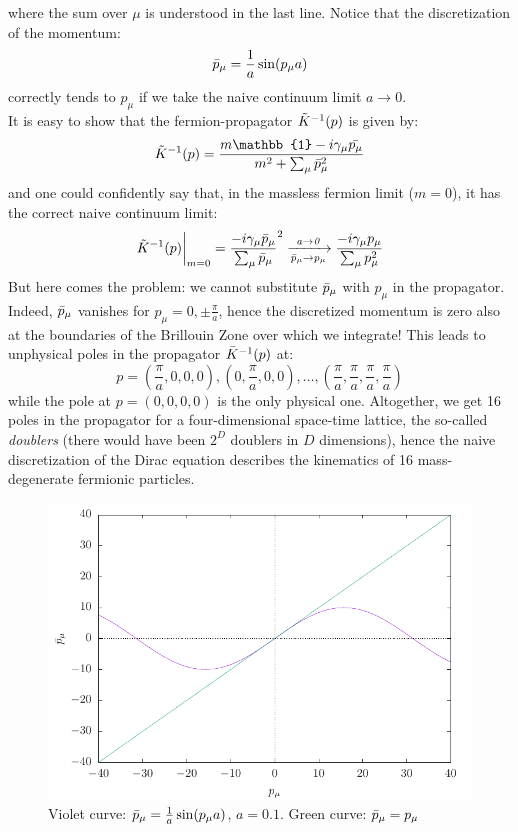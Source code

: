 where the sum over $\mu$ is understood in the last line. Notice that the discretization of the momentum:
\begin{equation}
    \Bar{p}_\mu = \frac{1}{a} \sin(p_\mu a)
\end{equation}
correctly tends to $p_\mu$ if we take the naive continuum limit $a \to 0$. 
\\ It is easy to show that the fermion-propagator $\Tilde{K}^{-1}(p)$ is given by:
\begin{equation}
    \Tilde{K}^{-1}(p) = \frac{m\mathbb{1} - i \gamma_\mu \Bar{p_\mu}}{m^2 + \sum_\mu \Bar{p}_\mu^2}
\end{equation}
and one could confidently say that, in the massless fermion limit ($m = 0$), it has the correct naive continuum limit:
\begin{equation}
    \Tilde{K}^{-1}(p) \bigg\rvert_{m = 0} = \frac{-i \gamma_\mu \Bar{p}_\mu}{\sum_\mu \Bar{p}_\mu}^2 \xrightarrow[\Bar{p}_\mu \to p_\mu]{\mathit{a \to 0}} \frac{-i \gamma_\mu p_\mu}{\sum_\mu p_\mu^2}
\end{equation}
But here comes the problem: we cannot substitute $\Bar{p}_\mu$ with $p_\mu$ in the propagator. Indeed, $\Bar{p}_\mu$ vanishes for $p_\mu = 0, \pm \frac{\pi}{a}$, hence the discretized momentum is zero also at the boundaries of the Brillouin Zone over which we integrate!
This leads to unphysical poles in the propagator $\Bar{K}^{-1}(p)$ at:
\begin{equation}
    p = \left(\frac{\pi}{a}, 0, 0, 0\right), \left(0, \frac{\pi}{a}, 0, 0 \right), \dots, \left(\frac{\pi}{a}, \frac{\pi}{a}, \frac{\pi}{a}, \frac{\pi}{a}\right)
\end{equation}
while the pole at $p = \left(0, 0, 0, 0 \right)$ is the only physical one. Altogether, we get 16 poles in the propagator for a four-dimensional space-time lattice, the so-called \textit{doublers} (there would have been $2^D$ doublers in $D$ dimensions), hence the naive discretization of the Dirac equation describes the kinematics of 16 mass-degenerate fermionic particles.
\\ \begin{figure}[H]
    \centering
    \includegraphics[width = 8 cm]{images/pbar.pdf}
    \caption{Violet curve: $\Bar{p}_\mu = \frac{1}{a} \sin(p_\mu a)$, $a = 0.1$. Green curve: $\Bar{p}_\mu = p_\mu$}
    \label{fig: pbar vs p}
\end{figure} 
